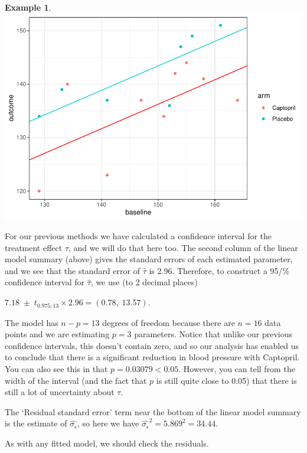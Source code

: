 \documentclass[
  openany]{book}
\newenvironment{Shaded}{\begin{snugshade}}{\end{snugshade}}
\newcommand{\FunctionTok}[1]{\textcolor[rgb]{0.13,0.29,0.53}{\textbf{#1}}}
\newcommand{\NormalTok}[1]{#1}
\newcommand{\OtherTok}[1]{\textcolor[rgb]{0.56,0.35,0.01}{#1}}
\newcommand{\SpecialCharTok}[1]{\textcolor[rgb]{0.81,0.36,0.00}{\textbf{#1}}}
\theoremstyle{definition}
\theoremstyle{definition}
\newtheorem{example}{Example}[chapter]
\theoremstyle{definition}
\theoremstyle{definition}
\theoremstyle{remark}
\begin{document}
\begin{example}
\includegraphics{CT4H_notes_files/figure-latex/unnamed-chunk-15-1.pdf}

For our previous methods we have calculated a confidence interval for the treatment effect \(\tau\), and we will do that here too. The second column of the linear model summary (above) gives the standard errors of each estimated parameter, and we see that the standard error of \(\hat{\tau}\) is 2.96. Therefore, to construct a 95/\% confidence interval for \(\hat{\tau}\), we use (to 2 decimal places)

\(7.18\; \pm\; t_{0.975;13}\times{2.96}  = \left(0.78,\; 13.57\right).\)

The model has \(n-p=13\) degrees of freedom because there are \(n=16\) data points and we are estimating \(p=3\) parameters.
Notice that unlike our previous confidence intervals, this doesn't contain zero, and so our analysis has enabled us to conclude that there is a significant reduction in blood pressure with Captopril. You can also see this in that \(p=0.03079<0.05\). However, you can tell from the width of the interval (and the fact that \(p\) is still quite close to 0.05) that there is still a lot of uncertainty about \(\tau\).

The `Residual standard error' term near the bottom of the linear model summary is the estimate of \(\hat{\sigma_\epsilon}\), so here we have \(\hat{\sigma_\epsilon}^2 = 5.869^2 = 34.44.\)

As with any fitted model, we should check the residuals.

\begin{Shaded}
\end{Shaded}
\end{example}
\end{document}
